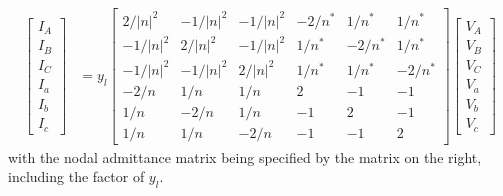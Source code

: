 \documentclass[10pt]{article}
\begin{document}
\begin{align}
\begin{bmatrix}I_A \\ I_B \\ I_C \\ I_a \\ I_b \\ I_c\end{bmatrix} &=
y_l \begin{bmatrix}
	2/|n|^2 & -1/|n|^2 & -1/|n|^2 & -2/n^* & 1/n^* & 1/n^* \\
	-1/|n|^2 & 2/|n|^2 & -1/|n|^2 & 1/n^* & -2/n^* & 1/n^* \\
	-1/|n|^2 & -1/|n|^2 & 2/|n|^2 & 1/n^* & 1/n^* & -2/n^* \\
	-2/n & 1/n & 1/n & 2 & -1 & -1 \\
	1/n & -2/n & 1/n & -1 & 2 & -1 \\
	1/n & 1/n & -2/n & -1 & -1 & 2
\end{bmatrix}
\begin{bmatrix}V_A \\ V_B \\ V_C \\ V_a \\ V_b \\ V_c\end{bmatrix}
\end{align}
with the nodal admittance matrix being specified by the matrix on the right, including the factor of $y_l$.
\end{document}
